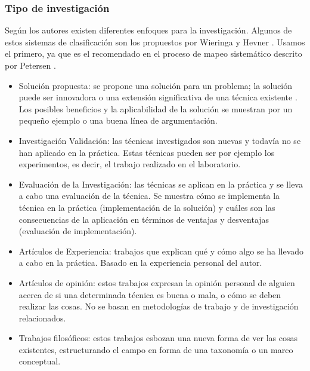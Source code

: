 \subsubsection{Tipo de investigación}
Según los autores existen diferentes enfoques para la investigación. Algunos de estos sistemas de clasificación son los propuestos por Wieringa \cite{Wieringa:2005} y Hevner \cite{Hevner:2004}. Usamos el primero, ya que es el recomendado en el proceso de mapeo sistemático descrito por Petersen \cite{Petersen:2008}.
\begin{itemize}
\item Solución propuesta: se propone una solución para un problema; la solución puede ser innovadora o una extensión significativa de una técnica existente . Los posibles beneficios y la aplicabilidad de la solución se muestran por un pequeño ejemplo o una buena línea de argumentación.
\item Investigación Validación: las técnicas investigados son nuevas y todavía no se han aplicado en la práctica. Estas técnicas pueden ser por ejemplo los experimentos, es decir, el trabajo realizado en el laboratorio.
\item Evaluación de la Investigación:  las técnicas se aplican en la práctica y se lleva a cabo una evaluación de la técnica. Se muestra cómo se implementa la técnica en la práctica (implementación de la solución) y cuáles son las consecuencias de la aplicación en términos de ventajas y desventajas (evaluación de implementación).
\item Artículos de Experiencia: trabajos que explican qué y cómo algo se ha llevado a cabo en la práctica. Basado en la experiencia personal del autor.
\item Artículos de opinión: estos trabajos expresan la opinión personal de alguien acerca de si una determinada técnica es buena o mala, o cómo se deben realizar las cosas. No se basan en metodologías de trabajo y de investigación relacionados.
\item Trabajos filosóficos: estos trabajos esbozan una nueva forma de ver las cosas existentes, estructurando el campo en forma de una taxonomía o un marco conceptual.
\end{itemize}

